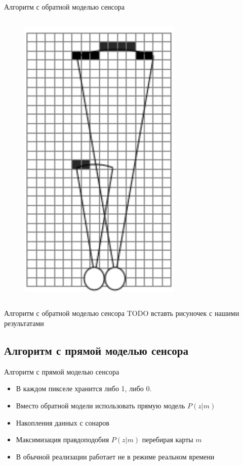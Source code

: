 \documentclass[9pt]{beamer}
\begin{document}
\begin{frame}{Алгоритм с обратной моделью сенсора}
\begin{columns}
\begin{column}{0.33\textwidth}
\begin{figure}[h]
    \includegraphics[width=0.7\textwidth]{inv3.png}
  \end{figure}
\end{column}
\end{columns}
\end{frame}

\begin{frame}{Алгоритм с обратной моделью сенсора}
TODO вставть рисуночек с нашими результатами
\end{frame}

\subsection{Алгоритм с прямой моделью сенсора}
\begin{frame}{Алгоритм с прямой моделью сенсора}
\begin{itemize}
  \item
  {
    В каждом пикселе хранится либо 1, либо 0. 
  }
  \item
  {
    Вместо обратной модели использовать прямую модель $P(z|m)$
  }
  \item
  {
    Накопления данных с сонаров
  }
  \item
  {
    Максимизация правдоподобия $P(z|m)$ перебирая карты $m$
  }
  \item
  {
    В обычной реализации работает не в режиме реальном времени
  }
\end{itemize}
\end{frame}
\end{document}
